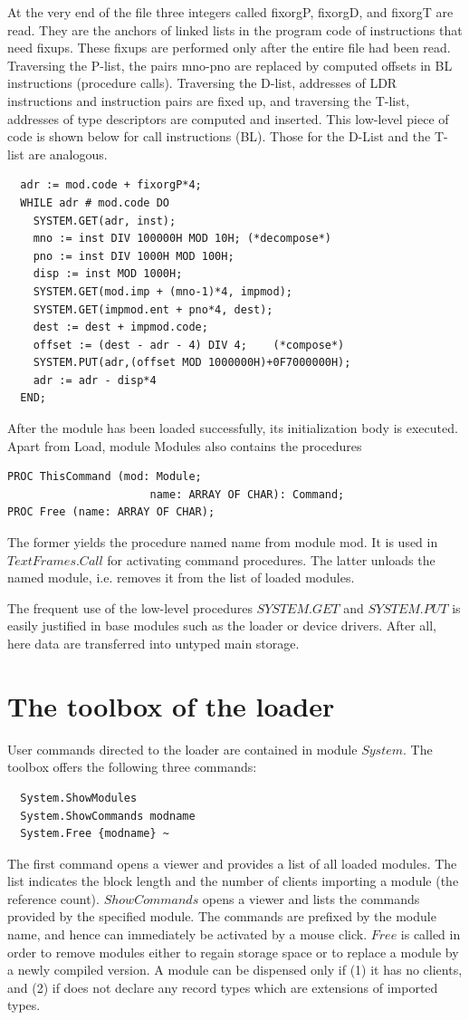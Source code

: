 At the very end of the file three integers called fixorgP, fixorgD, and fixorgT are read. They are the
anchors of linked lists in the program code of instructions that need fixups. These fixups are
performed only after the entire file had been read. Traversing the P-list, the pairs mno-pno are
replaced by computed offsets in BL instructions (procedure calls). Traversing the D-list, addresses of
LDR instructions and instruction pairs are fixed up, and traversing the T-list, addresses of type
descriptors are computed and inserted. This low-level piece of code is shown below for call
instructions (BL). Those for the D-List and the T-list are analogous.
\begin{verbatim}
  adr := mod.code + fixorgP*4;
  WHILE adr # mod.code DO
    SYSTEM.GET(adr, inst);
    mno := inst DIV 100000H MOD 10H; (*decompose*)
    pno := inst DIV 1000H MOD 100H;
    disp := inst MOD 1000H;
    SYSTEM.GET(mod.imp + (mno-1)*4, impmod);
    SYSTEM.GET(impmod.ent + pno*4, dest);
    dest := dest + impmod.code;
    offset := (dest - adr - 4) DIV 4;    (*compose*)
    SYSTEM.PUT(adr,(offset MOD 1000000H)+0F7000000H);
    adr := adr - disp*4
  END;
\end{verbatim}

After the module has been loaded successfully, its initialization body is executed.
Apart from Load, module Modules also contains the procedures
\begin{verbatim}
PROC ThisCommand (mod: Module;
                      name: ARRAY OF CHAR): Command;
PROC Free (name: ARRAY OF CHAR);
\end{verbatim}

The former yields the procedure named name from module mod. It is used in $TextFrames.Call$ for
activating command procedures. The latter unloads the named module, i.e. removes it from the list of
loaded modules.

The frequent use of the low-level procedures $SYSTEM.GET$ and $SYSTEM.PUT$ is easily justified in
base modules such as the loader or device drivers. After all, here data are transferred into untyped
main storage.

\section{The toolbox of the loader}
User commands directed to the loader are contained in module $System$. The toolbox offers the following three commands:
\begin{verbatim}
  System.ShowModules
  System.ShowCommands modname
  System.Free {modname} ~
\end{verbatim}
The first command opens a viewer and provides a list of all loaded modules. The list indicates the
block length and the number of clients importing a module (the reference count). $ShowCommands$
opens a viewer and lists the commands provided by the specified module. The commands are
prefixed by the module name, and hence can immediately be activated by a mouse click. $Free$ is
called in order to remove modules either to regain storage space or to replace a module by a newly
compiled version. A module can be dispensed only if (1) it has no clients, and (2) if does not declare
any record types which are extensions of imported types.

